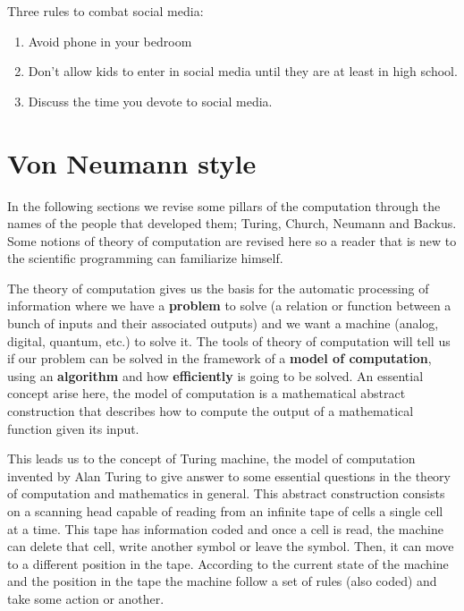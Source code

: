   
%  
%  
%  
% 

  
   
Three rules to combat social media:
\begin{enumerate} 
\item Avoid phone in your bedroom
\item Don't allow kids to enter in social media until they are at least in high school. 
\item Discuss the time you devote to social media. 
\end{enumerate} 

 
\newpage   
    \section{Von Neumann style} 


In the following sections we revise some pillars of the computation through the names of the people 
that developed them; Turing, Church, Neumann and Backus. 
Some notions of theory of computation are revised here so a reader that is new 
to the scientific programming can familiarize himself. 

The theory of computation gives us the basis for the automatic processing of information where we have a \textbf{problem} to solve (a 
relation or function between a bunch of inputs and their associated outputs) and we want a machine (analog, digital, quantum, etc.) to solve it. 
The tools of theory of computation will tell us if our problem can be solved in the framework of a \textbf{model of computation}, using an 
\textbf{algorithm} and how \textbf{efficiently} is going to be solved. 
An essential concept arise here, the model of computation is a mathematical abstract construction that describes how to compute the output of 
a mathematical function given its input. 

This leads us to the concept of Turing machine, the model of computation invented by Alan Turing to give answer to some essential questions 
in the theory of computation and mathematics in general. This abstract construction consists on a scanning head capable of reading from an 
infinite tape of cells a single cell at a time. This tape has information coded and once a cell is read, the machine can delete that cell, 
write another symbol or leave the symbol. Then, it can move to a different position in the tape. According to the current state of the 
machine and the position in the tape the machine follow a set of rules (also coded) and take some action or another. 

